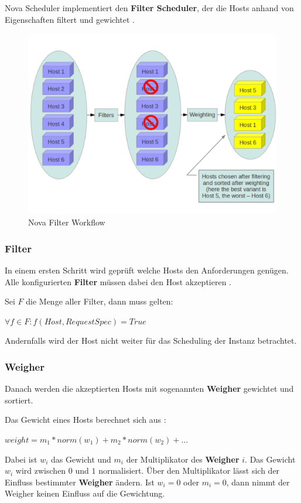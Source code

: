 \documentclass[../Main.tex]{subfiles}
\begin{document}
Nova Scheduler implementiert den \textbf{Filter Scheduler}, der die Hosts anhand von Eigenschaften filtert
und gewichtet \citep{ComputeSchedulers}.
\begin{figure}[h]
    \centering
    \includegraphics[width=0.9\columnwidth]{Images/NovaFilterWorkflow.png}
    \caption{Nova Filter Workflow \citep{ComputeSchedulers}}
\end{figure}

\subsubsection{Filter}

In einem ersten Schritt wird geprüft welche Hosts den Anforderungen
genügen. Alle konfigurierten \textbf{Filter} müssen dabei den Host akzeptieren \citep{ComputeSchedulers}.

Sei $F$ die Menge aller Filter, dann muss gelten:

\begin{center}
    $\forall f \in F: f(Host, RequestSpec) = True$
\end{center}

Andernfalls wird der Host nicht weiter
für das Scheduling der Instanz betrachtet.

\subsubsection{Weigher}
\label{chapter:Weigher}

Danach werden die akzeptierten Hosts mit sogenannten \textbf{Weigher} gewichtet und sortiert.

Das Gewicht eines Hosts berechnet sich aus \citep{NormalizedWeights}:
\begin{center}
    $weight = m_1 * norm(w_1) + m_2 * norm(w_2) + ...$
\end{center}
Dabei ist $w_i$ das Gewicht und $m_i$ der Multiplikator des \textbf{Weigher} $i$. Das Gewicht
$w_i$ wird zwischen $0$ und $1$ normalisiert. Über den Multiplikator lässt sich der Einfluss
bestimmter \textbf{Weigher} ändern. Ist $w_i = 0$ oder $m_i= 0$, dann nimmt der Weigher keinen Einfluss
auf die Gewichtung.
\end{document}
